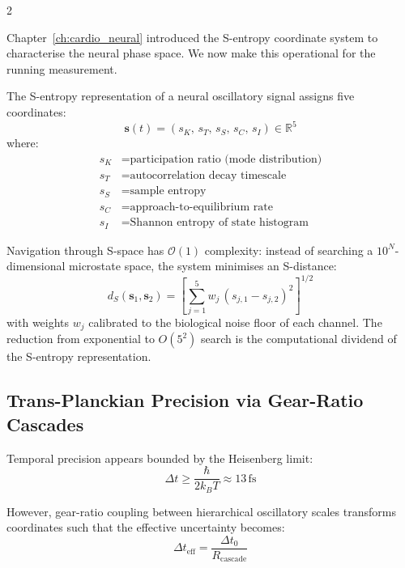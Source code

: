 \begin{multicols}{2}

Chapter~\ref{ch:cardio_neural} introduced the S-entropy coordinate system to characterise the neural phase space. We now make this operational for the running measurement.

\begin{definition}
The S-entropy representation of a neural oscillatory signal assigns five coordinates:
\begin{equation}
\mathbf{s}(t) = (s_K,\, s_T,\, s_S,\, s_C,\, s_I) \in \mathbb{R}^5
\end{equation}
where:
\begin{align}
s_K &= \text{participation ratio (mode distribution)} \\
s_T &= \text{autocorrelation decay timescale} \\
s_S &= \text{sample entropy} \\
s_C &= \text{approach-to-equilibrium rate} \\
s_I &= \text{Shannon entropy of state histogram}
\end{align}
\end{definition}

Navigation through S-space has $\mathcal{O}(1)$ complexity: instead of searching a $10^N$-dimensional microstate space, the system minimises an S-distance:
\begin{equation}
d_S(\mathbf{s}_1, \mathbf{s}_2) = \left[\sum_{j=1}^5 w_j\,(s_{j,1} - s_{j,2})^2\right]^{1/2}
\end{equation}
with weights $w_j$ calibrated to the biological noise floor of each channel. The reduction from exponential to $O(5^2)$ search is the computational dividend of the S-entropy representation.

\subsection{Trans-Planckian Precision via Gear-Ratio Cascades}

Temporal precision appears bounded by the Heisenberg limit:
\begin{equation}
\Delta t \geq \frac{\hbar}{2k_BT} \approx 13\,\mathrm{fs}
\end{equation}

However, gear-ratio coupling between hierarchical oscillatory scales transforms coordinates such that the effective uncertainty becomes:
\begin{equation}
\Delta t_{\mathrm{eff}} = \frac{\Delta t_0}{R_{\mathrm{cascade}}}
\end{equation}


\end{multicols}
